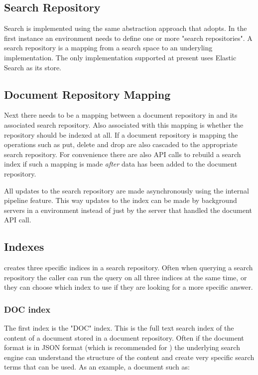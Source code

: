 \subsection{Search Repository}
Search is implemented using the same abstraction approach that \Rapture adopts. In the first instance an environment needs to define
one or more "search repositories". A search repository is a mapping from a \Rapture search space to an underyling implementation. The
only implementation supported at present uses Elastic Search as its store.

\subsection{Document Repository Mapping}
Next there needs to be a mapping between a document repository in \Rapture and its associated search repository. Also associated with
this mapping is whether the repository should be indexed at all. If a document repository is mapping the operations such as
put, delete and drop are also cascaded to the appropriate search repository. For convenience there are also API calls to rebuild a search
index if such a mapping is made \emph{after} data has been added to the document repository.

All updates to the search repository are made asynchronously using the internal pipeline feature. This way updates to the index can be
made by background servers in a \Rapture environment instead of just by the server that handled the document API call.

\subsection{Indexes}
\Rapture creates three specific indices in a search repository. Often when querying a search repository the caller can run the query on
all three indices at the same time, or they can choose which index to use if they are looking for a more specific answer.

\subsubsection{DOC index}
The first index is the "DOC" index. This is the full text search index of the content of a document stored in a document repository. Often
if the document format is in JSON format (which is recommended for \Rapture) the underlying search engine can understand the structure of the
content and create very specific search terms that can be used. As an example, a document such as:

